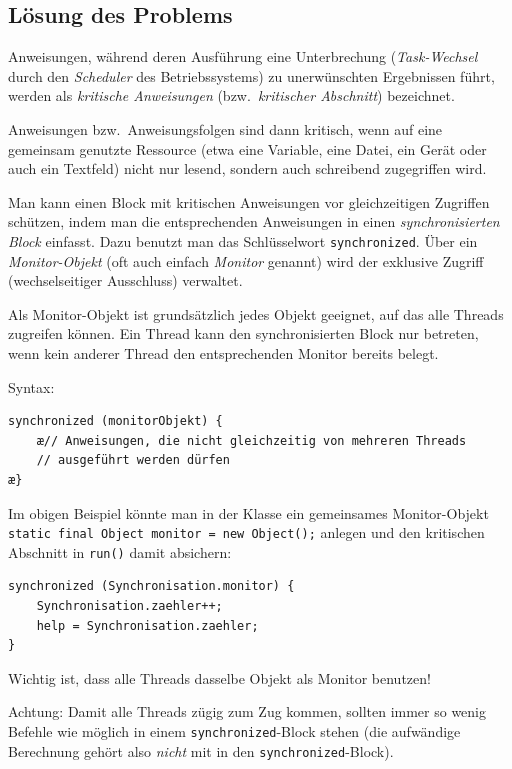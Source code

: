 \subsection{Lösung des Problems}

Anweisungen, während deren Ausführung eine Unterbrechung (\emph{Task-Wechsel}
durch den \emph{Scheduler} des Betriebssystems) zu unerwünschten Ergebnissen
führt, werden als \emph{kritische Anweisungen} (bzw.\ \emph{kritischer
Abschnitt}) bezeichnet.

Anweisungen bzw.\ Anweisungsfolgen sind dann kritisch, wenn auf eine gemeinsam
genutzte Ressource (etwa eine Variable, eine Datei, ein Gerät oder auch ein
Textfeld) nicht nur lesend, sondern auch schreibend zugegriffen wird.

Man kann einen Block mit kritischen Anweisungen vor gleichzeitigen Zugriffen
schützen, indem man die entsprechenden Anweisungen in einen
\emph{synchronisierten Block} einfasst. Dazu benutzt man das Schlüsselwort
\lstinline|synchronized|. Über ein \emph{Monitor-Objekt} (oft auch einfach
\emph{Monitor} genannt) wird der exklusive Zugriff (wechselseitiger Ausschluss)
verwaltet.

Als Monitor-Objekt ist grundsätzlich jedes Objekt geeignet, auf das alle
Threads zugreifen können. Ein Thread kann den synchronisierten Block nur
betreten, wenn kein anderer Thread den entsprechenden Monitor bereits belegt.

Syntax:

\begin{lstlisting}
synchronized (monitorObjekt) {
    æ// Anweisungen, die nicht gleichzeitig von mehreren Threads
    // ausgeführt werden dürfen
æ}
\end{lstlisting}

Im obigen Beispiel könnte man in der Klasse  ein
gemeinsames Monitor-Objekt \lstinline|static final Object monitor = new Object();|
anlegen und den kritischen Abschnitt in \lstinline|run()| damit absichern:

\begin{lstlisting}
synchronized (Synchronisation.monitor) {
    Synchronisation.zaehler++;
    help = Synchronisation.zaehler;
}
\end{lstlisting}

Wichtig ist, dass alle Threads dasselbe Objekt als Monitor benutzen!

Achtung: Damit alle Threads zügig zum Zug kommen, sollten immer so wenig
Befehle wie möglich in einem \lstinline|synchronized|-Block stehen (die
aufwändige Berechnung gehört also \emph{nicht} mit in den
\lstinline|synchronized|-Block).
